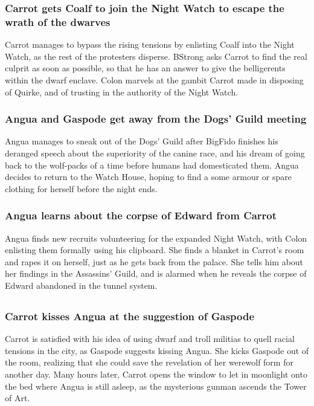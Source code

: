 \subsubsection{\Gls{Carrot} gets \Gls{Coalf} to join the Night Watch to escape the wrath of the
    dwarves}
\Gls{Carrot} manages to bypass the rising tensions by enlisting \Gls{Coalf} into the Night Watch,
as the rest of the protesters disperse. \Gls{BStrong} asks \Gls{Carrot} to find the real culprit as
soon as possible, so that he has an answer to give the belligerents within the dwarf enclave.
\Gls{Colon} marvels at the gambit \Gls{Carrot} made in disposing of \Gls{Quirke}, and of trusting
in the authority of the Night Watch.

\subsubsection{\Gls{Angua} and \Gls{Gaspode} get away from the Dogs' Guild meeting}
\Gls{Angua} manages to sneak out of the Dogs' Guild after \Gls{BigFido} finishes his deranged speech
about the superiority of the canine race, and his dream of going back to the wolf-packs of a time
before humans had domesticated them. \Gls{Angua} decides to return to the Watch House, hoping to
find a some armour or spare clothing for herself before the night ends.

\subsubsection{\Gls{Angua} learns about the corpse of \Gls{Edward} from \Gls{Carrot}}
\Gls{Angua} finds new recruits volunteering for the expanded Night Watch, with \Gls{Colon} enlisting
them formally using his clipboard. She finds a blanket in \Gls{Carrot}'s room and rapes it on
herself, just as he gets back from the palace. She tells him about her findings in the Assassins'
Guild, and is alarmed when he reveals the corpse of \Gls{Edward} abandoned in the tunnel system.

\subsection{}
\subsubsection{\Gls{Carrot} kisses \Gls{Angua} at the suggestion of \Gls{Gaspode}}
\Gls{Carrot} is satisfied with his idea of using dwarf and troll militias to quell racial tensions
in the city, as \Gls{Gaspode} suggests kissing \Gls{Angua}. She kicks \Gls{Gaspode} out of the room,
realizing that she could save the revelation of her werewolf form for another day. Many hours later,
\Gls{Carrot} opens the window to let in moonlight onto the bed where \Gls{Angua} is still asleep,
as the mysterious gunman ascends the Tower of Art.

